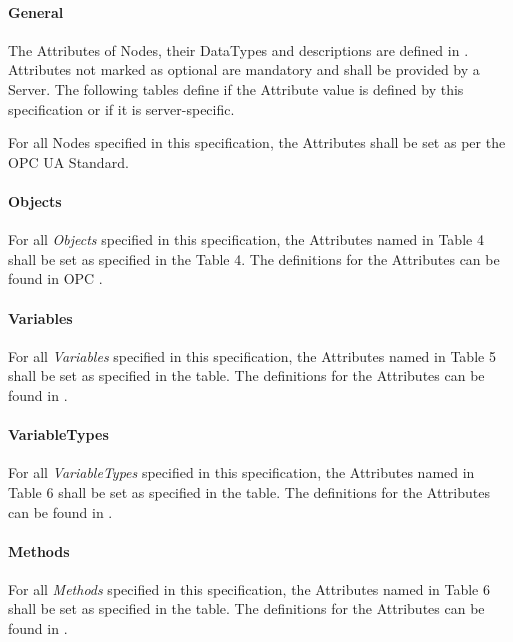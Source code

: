 \paragraph{General}
The Attributes of Nodes, their DataTypes and descriptions are defined in \cite{UAPart3}. Attributes not marked as optional are mandatory and shall be provided by a Server. The following tables define if the Attribute value is defined by this specification or if it is server-specific.

For all Nodes specified in this specification, the Attributes shall be set as per the OPC UA Standard.

\paragraph{Objects}

For all \textit{Objects} specified in this specification, the Attributes named in Table 4 shall be set as specified in the Table 4. The definitions for the Attributes can be found in OPC \cite{UAPart3}.

\paragraph{Variables}

For all \textit{Variables} specified in this specification, the Attributes named in Table 5 shall be set as specified in the table. The definitions for the Attributes can be found in \cite{UAPart3}.

\paragraph{VariableTypes}
For all \textit{VariableTypes} specified in this specification, the Attributes named in Table 6 shall be set as specified in the table. The definitions for the Attributes can be found in \cite{UAPart3}.

\paragraph{Methods}
For all \textit{Methods} specified in this specification, the Attributes named in Table 6 shall be set as specified in the table. The definitions for the Attributes can be found in \cite{UAPart3}.